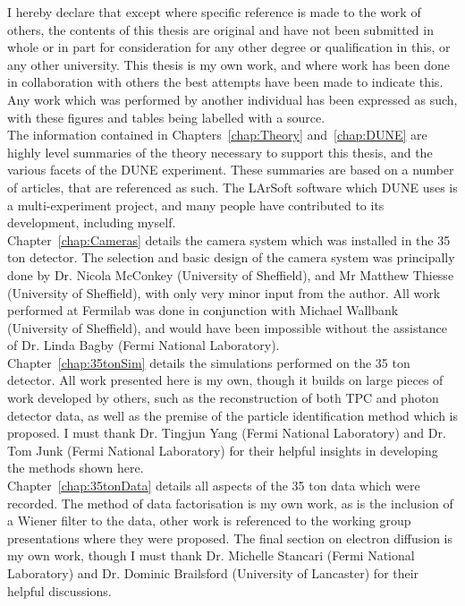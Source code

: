 
\begin{declaration}

  I hereby declare that except where specific reference is made to the work of others, the contents of this thesis are original and have not been submitted in whole or in part for consideration for any other degree or qualification in this, or any other university. This thesis is my own work, and where work has been done in collaboration with others the best attempts have been made to indicate this. Any work which was performed by another individual has been expressed as such, with these figures and tables being labelled with a source. \\

  The information contained in Chapters~\ref{chap:Theory} and~\ref{chap:DUNE} are highly level summaries of the theory necessary to support this thesis, and the various facets of the DUNE experiment. These summaries are based on a number of articles, that are referenced as such. The LArSoft software which DUNE uses is a multi-experiment project, and many people have contributed to its development, including myself. \\

  Chapter~\ref{chap:Cameras} details the camera system which was installed in the 35 ton detector. The selection and basic design of the camera system was principally done by Dr. Nicola McConkey (University of Sheffield), and Mr Matthew Thiesse (University of Sheffield), with only very minor input from the author. All work performed at Fermilab was done in conjunction with Michael Wallbank (University of Sheffield), and would have been impossible without the assistance of Dr. Linda Bagby (Fermi National Laboratory). \\

  Chapter~\ref{chap:35tonSim} details the simulations performed on the 35 ton detector. All work presented here is my own, though it builds on large pieces of work developed by others, such as the reconstruction of both TPC and photon detector data, as well as the premise of the particle identification method which is proposed. I must thank Dr. Tingjun Yang (Fermi National Laboratory) and Dr. Tom Junk (Fermi National Laboratory) for their helpful insights in developing the methods shown here. \\

  Chapter~\ref{chap:35tonData} details all aspects of the 35 ton data which were recorded. The method of data factorisation is my own work, as is the inclusion of a Wiener filter to the data, other work is referenced to the working group presentations where they were proposed. The final section on electron diffusion is my own work, though I must thank Dr. Michelle Stancari (Fermi National Laboratory) and Dr. Dominic Brailsford (University of Lancaster) for their helpful discussions. \\


\end{declaration}
